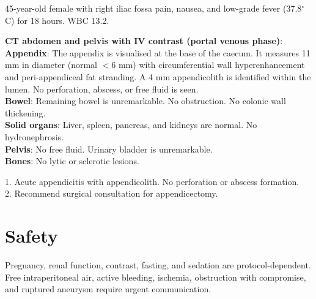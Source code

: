 \begin{testbox}[Indications:]
45-year-old female with right iliac fossa pain, nausea, and low-grade fever (37.8$^\circ$C) for 18 hours. WBC 13.2.
\end{testbox}
\begin{refbox}[Findings:]
\textbf{CT abdomen and pelvis with IV contrast (portal venous phase)}:
\textbf{Appendix}: The appendix is visualised at the base of the caecum. It measures 11 mm in diameter (normal $< 6$ mm) with circumferential wall hyperenhancement and peri-appendiceal fat stranding. A 4 mm appendicolith is identified within the lumen. No perforation, abscess, or free fluid is seen.\\
\textbf{Bowel}: Remaining bowel is unremarkable. No obstruction. No colonic wall thickening.\\
\textbf{Solid organs}: Liver, spleen, pancreas, and kidneys are normal. No hydronephrosis.\\
\textbf{Pelvis}: No free fluid. Urinary bladder is unremarkable.\\
\textbf{Bones}: No lytic or sclerotic lesions.
\end{refbox}
\begin{pearlbox}[Impression:]
1. Acute appendicitis with appendicolith. No perforation or abscess formation.\\
2. Recommend surgical consultation for appendicectomy.
\end{pearlbox}


\section{Safety}
Pregnancy, renal function, contrast, fasting, and sedation are protocol-dependent. Free intraperitoneal air, active bleeding, ischemia, obstruction with compromise, and ruptured aneurysm require urgent communication.

\clearpage
